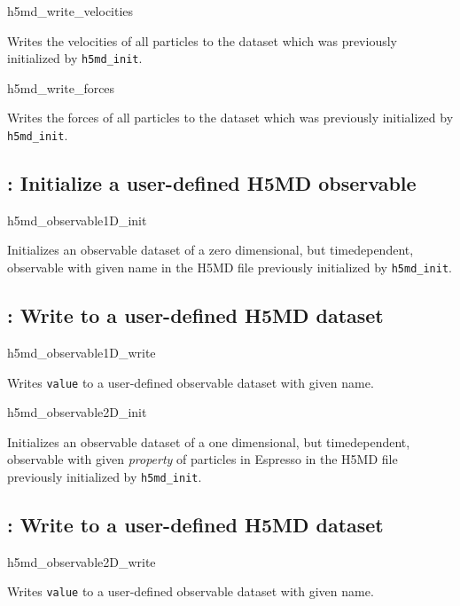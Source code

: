 \begin{essyntax}
h5md_write_velocities
\end{essyntax}
Writes the velocities of all particles to the dataset which was previously 
initialized by \texttt{h5md_init}.

\begin{essyntax}
h5md_write_forces
\end{essyntax}
Writes the forces of all particles to the dataset which was previously 
initialized by \texttt{h5md_init}.

\subsection{: Initialize a user-defined H5MD
observable}

\begin{essyntax}
h5md_observable1D_init 
\end{essyntax}
Initializes an observable dataset of a zero dimensional, but timedependent, 
observable with given name in the H5MD file previously
initialized by \texttt{h5md_init}.

\subsection{: Write to a user-defined H5MD
dataset}

\begin{essyntax}
h5md_observable1D_write  
\end{essyntax}
Writes \texttt{value} to a user-defined observable dataset with given name.


\begin{essyntax}
h5md_observable2D_init 
\end{essyntax}
Initializes an observable dataset of a one dimensional, but timedependent, 
observable with given \textit{property} of particles in Espresso in the H5MD file previously
initialized by \texttt{h5md_init}.

\subsection{: Write to a user-defined H5MD
dataset}

\begin{essyntax}
h5md_observable2D_write  
\end{essyntax}
Writes \texttt{value} to a user-defined observable dataset with given name.

